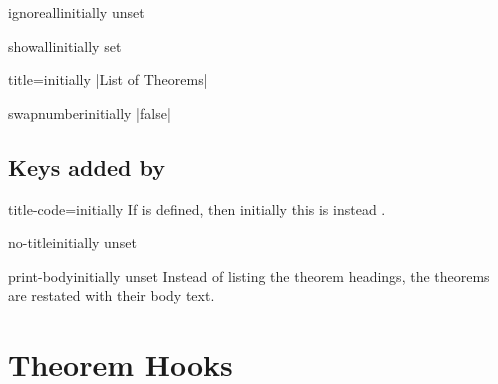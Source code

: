 \documentclass{ltxdoc}
\newcommand{\ttbraces}[1]{\braces{\texttt{#1}}}
\begin{document}
\begin{docKey}{ignoreall}{}{initially unset}

\end{docKey}

\begin{docKey}{showall}{}{initially set}

\end{docKey}

\begin{docKey}{title}{=}{initially |List of Theorems|}

\end{docKey}

\begin{docKey}{swapnumber}{}{initially |false|}

\end{docKey}

\subsection{Keys added by }

\begin{docKey}{title-code}{=}{initially \ttbraces{\#1}}
If  is defined, then initially this is instead \ttbraces{\#1}.
\end{docKey}

\begin{docKey}{no-title}{}{initially unset}

\end{docKey}

\begin{docKey}{print-body}{}{initially unset}
Instead of listing the theorem headings, the theorems are restated with their body text.
\end{docKey}

\section{Theorem Hooks} \label{keythms-hooks}
\end{document}
